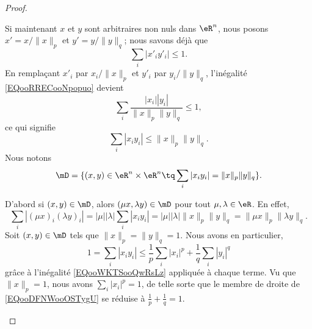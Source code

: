 \begin{proof}
\begin{subproof}
		Si maintenant \( x\) et \( y\) sont arbitraires non nuls dans \( \eR^n\), nous posons \( x'=x/\| x \|_p\) et \( y'=y/\| y \|_q\); nous savons déjà que
		\begin{equation}        \label{EQooRRECooNpopuo}
			\sum_i| x'_iy'_i |\leq 1.
		\end{equation}
		En remplaçant \( x'_i\) par \( x_i/\| x \|_p\) et \( y'_i\) par \( y_i/\| y \|_q\), l'inégalité \eqref{EQooRRECooNpopuo} devient
		\begin{equation}
			\sum_i\frac{ | x_i ||y_i| }{ \| x \|_p\| y \|_q  }\leq 1,
		\end{equation}
		ce qui signifie
		\begin{equation}
			\sum_i| x_iy_i |\leq \| x \|_p\| y \|_q.
		\end{equation}
		Nous notons
		\begin{equation}
			\mD=\{ (x,y)\in \eR^n\times \eR^n\tq \sum_i| x_iy_i |=\| x \|_p\| y \|_q \}.
		\end{equation}
		\begin{subproof}
			\spitem[Multiplications]
			D'abord si \( (x,y)\in\mD\), alors \( (\mu x, \lambda y)\in \mD\) pour tout \( \mu,\lambda\in \eR\). En effet,
			\begin{equation}
				\sum_i| (\mu x)_i(\lambda y)_i |=| \mu | |\lambda |\sum_i| x_iy_i |=| \mu | |\lambda |\| x \|_p\| y \|_q=\|\mu x \|_p\| \lambda y \|_q.
			\end{equation}
			Soit \( (x,y)\in \mD\) tels que \( \| x \|_p=\| y \|_q=1\). Nous avons en particulier,
			\begin{equation}    \label{EQooDFNWooOSTygU}
				1=\sum_i| x_iy_i |\leq \frac{1}{ p }\sum_i| x_i |^p+\frac{1}{ q }\sum_i| y_i |^q
			\end{equation}
			grâce à l'inégalité \eqref{EQooWKTSooQwRsLz} appliquée à chaque terme. Vu que \( \| x \|_p=1\), nous avons \( \sum_i| x_i |^p=1\), de telle sorte que le membre de droite de \eqref{EQooDFNWooOSTygU} se réduise à \( \frac{1}{ p }+\frac{1}{ q }=1\).


\end{subproof}
\end{subproof}
\end{proof}
